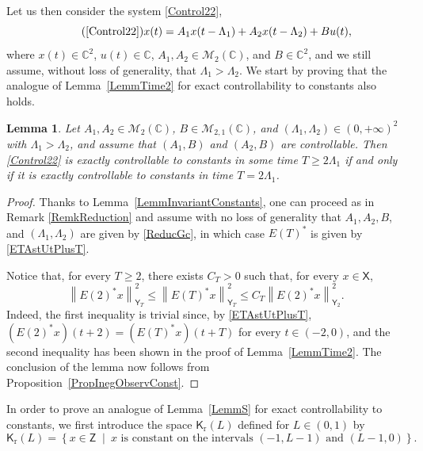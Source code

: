 \documentclass[JEP,XML,SOM,Unicode]{cedram}
\theoremstyle{plain}
\newtheorem{lemm}[theo]{Lemma}
\theoremstyle{definition}
\newcommand{\midsuchthat}{\;\middle|\:}
\newcommand{\norm}[1]{\left\lVert #1\right\lVert}
\begin{document}
Let us then consider the system \eqref{Control22}, \ie 
\begin{equation*}
\tag{\ref{Control22}}
x(t) = A_1 x(t - \Lambda_1) + A_2 x(t - \Lambda_2) + B u(t),
\end{equation*}
where $x(t) \in \mathbb C^2$, $u(t) \in \mathbb C$, $A_1, A_2 \in \mathcal M_2(\mathbb C)$, and $B \in \mathbb C^2$, and we still assume, without loss of generality, that $\Lambda_1 > \Lambda_2$. We start by proving that the analogue of Lemma~\ref{LemmTime2} for exact controllability to constants also holds.

\begin{lemm}
\label{LemmContConstTIff2}
Let $A_1, A_2 \in \mathcal M_2(\mathbb C)$, $B \in \mathcal M_{2, 1}(\mathbb C)$, and $(\Lambda_1, \Lambda_2) \in (0, +\infty)^2$ with $\Lambda_1 > \Lambda_2$, and assume that $(A_1, B)$ and $(A_2, B)$ are controllable. Then \eqref{Control22} is exactly controllable to constants in some time $T \geq 2 \Lambda_1$ if and only if it is exactly controllable to constants in time $T = 2 \Lambda_1$.
\end{lemm}

\begin{proof}
Thanks to Lemma~\ref{LemmInvariantConstants}, one can proceed as in Remark \ref{RemkReduction} and assume with no loss of generality that $A_1, A_2, B$, and $(\Lambda_1, \Lambda_2)$ are given by \eqref{ReducGc}, in which case $E(T)^\ast$ is given by \eqref{ETAstUtPlusT}.

Notice that, for every $T \geq 2$, there exists $C_T > 0$ such that, for every $x \in \mathsf X$,
\begin{equation}
\label{EquivE2ET}
\norm{E(2)^\ast x}_{\mathsf Y_T}^2 \leq \norm{E(T)^\ast x}_{\mathsf Y_T}^2 \leq C_T \norm{E(2)^\ast x}_{\mathsf Y_2}^2.
\end{equation}
Indeed, the first inequality is trivial since, by \eqref{ETAstUtPlusT}, $(E(2)^\ast x)(t + 2) = (E(T)^\ast x)(t + T)$ for every $t \in (-2, 0)$, and the second inequality has been shown in the proof of Lemma~\ref{LemmTime2}. The conclusion of the lemma now follows from Proposition~\ref{PropInegObservConst}.
\end{proof}

In order to prove an analogue of Lemma~\ref{LemmS} for exact controllability to constants, we first introduce the space $\mathsf K_{\mathrm r}(L)$ defined for $L \in (0, 1)$ by
\[
\mathsf K_{\mathrm r}(L) = \left\{x \in \mathsf Z \midsuchthat x \text{ is constant on the intervals } (-1, L-1) \text{ and } (L-1, 0)\right\}.
\]
\end{document}
